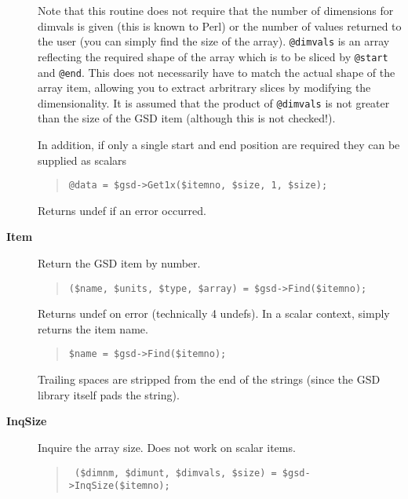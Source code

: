 \documentclass[twoside,11pt]{article}
\newenvironment{myquote}{\begin{quote}\begin{small}}{\end{small}\end{quote}}
\newcommand{\perl}{\xref{\textsf{Perl}}{sun193}{}}
\newcommand{\xref}[3]{#1}
\renewcommand{\_}{\texttt{\symbol{95}}}
\begin{document}
\begin{description}
Note that this routine does not require that the number of dimensions for
dimvals is given (this is known to \perl) or the number of values returned to
the user (you can simply find the size of the array).  \texttt{@dimvals} is an
array reflecting the required shape of the array which is to be sliced by
\texttt{@start} and \texttt{@end}. This does not necessarily have to match the
actual shape of the array item, allowing you to extract arbritrary slices by
modifying the dimensionality. It is assumed that the product of
\texttt{@dimvals} is not greater than the size of the GSD item (although this
is not checked!).



In addition, if only a single start and end position are required
they can be supplied as scalars

\begin{myquote}
\begin{verbatim}
@data = $gsd->Get1x($itemno, $size, 1, $size);
\end{verbatim}
\end{myquote}

Returns undef if an error occurred.

\item[\textbf{Item}] \mbox{}

Return the GSD item by number.

\begin{myquote}
\begin{verbatim}
($name, $units, $type, $array) = $gsd->Find($itemno);
\end{verbatim}
\end{myquote}

Returns undef on error (technically 4 undefs).
In a scalar context, simply returns the item name.

\begin{myquote}
\begin{verbatim}
$name = $gsd->Find($itemno);
\end{verbatim}
\end{myquote} %

Trailing spaces are stripped from the end of the strings (since the
GSD library itself pads the string).

\item[\textbf{InqSize}] \mbox{}

Inquire the array size. Does not work on scalar items.

\begin{myquote}
\begin{verbatim}
 ($dimnm, $dimunt, $dimvals, $size) = $gsd->InqSize($itemno);
\end{verbatim}
\end{myquote}


\end{description}
\end{document}
